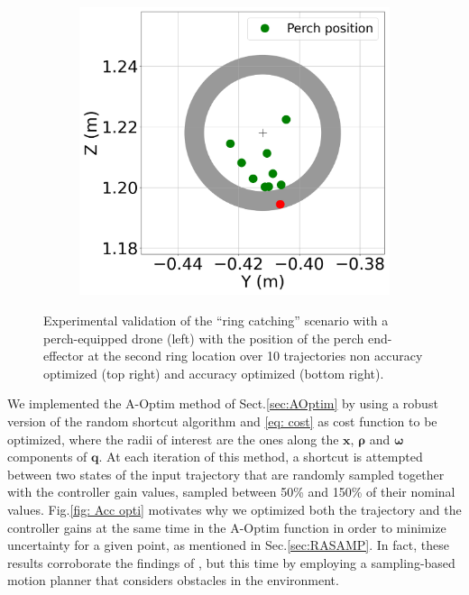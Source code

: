 \begin{figure} [t]
\begin{subfigure}{0.37\linewidth}
      \includegraphics[width=\linewidth]{figures/robust_accurate/Exp_ring_opti_full_zoom.png}
    \end{subfigure}\hfill
    
  \caption{Experimental validation of the ``ring catching'' scenario with a perch-equipped drone (left) with the position of the perch end-effector at the second ring location over 10 trajectories non accuracy optimized (top right) and accuracy optimized (bottom right).}
  \label{fig: exp ring}
\end{figure}

We implemented the A-Optim method of Sect.\ref{sec:AOptim} by using a robust version of the random shortcut algorithm \cite{cShortcut} and \eqref{eq: cost} as cost function to be optimized, where the radii of interest are the ones along the $\boldsymbol{x}$, $\boldsymbol{\rho}$ and $\boldsymbol{\omega}$ components of $\boldsymbol{q}$.
At each iteration of this method, a shortcut is attempted between two states of the input trajectory that are randomly sampled together with the controller gain values, sampled between 50\% and 150\% of their nominal values.
Fig.\ref{fig: Acc opti} motivates why we optimized both the trajectory and the controller gains at the same time in the A-Optim function in order to minimize uncertainty for a given point, as mentioned in Sec.\ref{sec:RASAMP}. In fact, these results corroborate the findings of \cite{AliIROS}, but this time by employing a sampling-based motion planner that considers obstacles in the environment.

